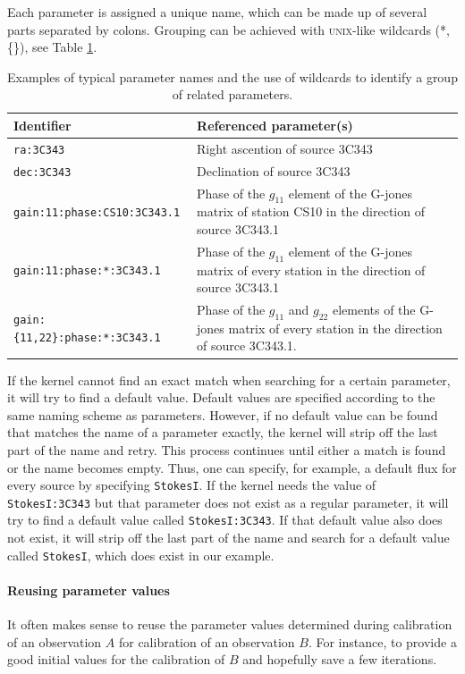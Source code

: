 \documentclass[10pt]{lofar}
\begin{document}
Each parameter is assigned a unique name, which can be made up of several parts
separated by colons. Grouping can be achieved with \textsc{unix}-like wildcards
(*, \{\}), see Table \ref{tab:naming_scheme}.
\begin{table}[htb!]
\centering
\begin{tabular}{lp{}}
\hline
\textbf{Identifier} & \textbf{Referenced parameter(s)} \\
\hline
\texttt{ra:3C343} & Right ascention of source 3C343 \\
\hline
\texttt{dec:3C343} & Declination of source 3C343 \\
\hline
\texttt{gain:11:phase:CS10:3C343.1} & Phase of the $g_{11}$ element of the
G-jones matrix of station CS10 in the direction of source 3C343.1 \\
\hline
\texttt{gain:11:phase:*:3C343.1} & Phase of the $g_{11}$ element of the G-jones
matrix of every station in the direction of source 3C343.1 \\
\hline
\texttt{gain:\{11,22\}:phase:*:3C343.1} & Phase of the $g_{11}$ and $g_{22}$
elements of the G-jones matrix of every station in the direction of source 3C343.1. \\
\hline
\end{tabular}
\caption{Examples of typical parameter names and the use of wildcards to
identify a group of related parameters.}
\label{tab:naming_scheme}
\end{table}
If the kernel cannot find an exact match when searching for a certain parameter,
it will try to find a default value. Default values are specified according to
the same naming scheme as parameters. However, if no default value can be found
that matches the name of a parameter exactly, the kernel will strip off the last
part of the name and retry. This process continues until either a match is found
or the name becomes empty. Thus, one can specify, for example, a default flux for
every source by specifying \texttt{StokesI}. If the kernel needs the value of
\texttt{StokesI:3C343} but that parameter does not exist as a regular parameter,
it will try to find a default value called \texttt{StokesI:3C343}. If that
default value also does not exist, it will strip off the last part of the name
and search for a default value called \texttt{StokesI}, which does exist in our
example.

\paragraph{Reusing parameter values}
It often makes sense to reuse the parameter values determined during
calibration of an observation $A$ for calibration of an observation $B$. For
instance, to provide a good initial values for the calibration of $B$ and
hopefully save a few iterations.
\end{document}
